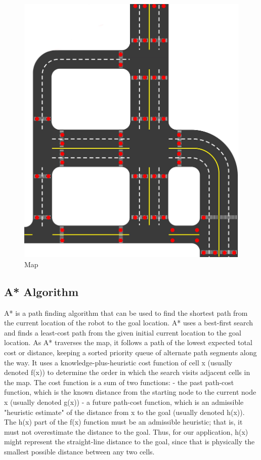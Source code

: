 \begin{figure}%
    \center%
    \includegraphics[width=1\textwidth]{images/motion/map.jpg}%
    \caption[Map]{Map}\label{fig: Map}%
  \end{figure}

\subsection{A* Algorithm}
\hspace{2cm}A* is a path finding algorithm that can be used to find the shortest path from the current location of the robot to the goal location.
A* uses a best-first search and finds a least-cost path from the given initial current location to the goal location. As A* traverses the map, it follows a path of the lowest expected total cost or distance, keeping a sorted priority queue of alternate path segments along the way. It uses a knowledge-plus-heuristic cost function of cell x (usually denoted f(x)) to determine the order in which the search visits adjacent cells in the map. The cost function is a sum of two functions: - the past path-cost function, which is the known distance from the starting node to the current node x (usually denoted g(x)) - a future path-cost function, which is an admissible "heuristic estimate" of the distance from x to the goal (usually denoted h(x)). The h(x) part of the f(x) function must be an admissible heuristic; that is, it must not overestimate the distance to the goal. Thus, for our application, h(x) might represent the straight-line distance to the goal, since that is physically the smallest possible distance between any two cells. \newline

